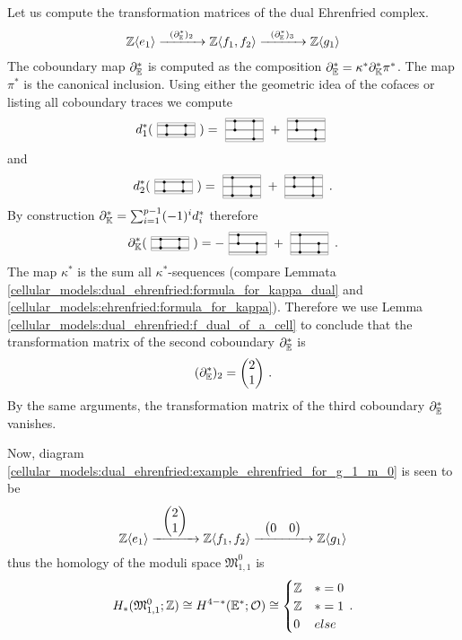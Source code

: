 Let us compute the transformation matrices of the dual Ehrenfried complex.
\begin{align}
    \label{cellular_models:dual_ehrenfried:example_ehrenfried_for_g_1_m_0}
    \Z\langle e_1 \rangle \xr{(\del^\ast_\E)_2} \Z\langle f_1, f_2 \rangle \xr{(\del^\ast_\E)_3} \Z\langle g_1 \rangle
\end{align}
The coboundary map $\partial_\mathbb E^\ast$ is computed as the composition $\partial_\mathbb E^\ast = \kappa^\ast \partial^\ast_\mathbb K \pi^\ast$.
The map $\pi^\ast$ is the canonical inclusion.
Using either the geometric idea of the cofaces or listing all coboundary traces we compute
\[
    d^\ast_1(\zweizweizelle{2}{1}{2}{1}) = \dreizweizelle{3}{2}{3}{1} + \dreizweizelle{3}{2}{2}{1}
\]
and
\[
    d^\ast_2(\zweizweizelle{2}{1}{2}{1}) = \dreizweizelle{3}{1}{2}{1} + \dreizweizelle{3}{2}{3}{1} \,.
\]
By construction $\partial^\ast_\mathbb K = \sum_{i=1}^{p-1} (-1)^i d^\ast_i$ therefore 
\[
    \del^\ast_\KK(\zweizweizelle{2}{1}{2}{1}) = - \dreizweizelle{3}{2}{2}{1} + \dreizweizelle{3}{1}{2}{1} \,.
\]
The map $\kappa^\ast$ is the sum all $\kappa^\ast$-sequences (compare Lemmata \ref{cellular_models:dual_ehrenfried:formula_for_kappa_dual} and \ref{cellular_models:ehrenfried:formula_for_kappa}).
Therefore we use Lemma \ref{cellular_models:dual_ehrenfried:f_dual_of_a_cell} to conclude that the transformation matrix of the second coboundary $\partial^\ast_\mathbb E$ is
\[
    (\partial^\ast_\mathbb E)_2 = \begin{pmatrix} 2 \\ 1 \end{pmatrix} \,.
\]
By the same arguments, the transformation matrix of the third coboundary $\partial^\ast_\mathbb E$ vanishes.

Now, diagram \eqref{cellular_models:dual_ehrenfried:example_ehrenfried_for_g_1_m_0} is seen to be
\[
    \mathbb Z\langle e_1 \rangle \xrightarrow{\hspace{6pt}{ \begin{pmatrix} 2 \\ 1 \end{pmatrix} }\hspace{6pt}} \mathbb Z\langle f_1, f_2 \rangle \xrightarrow{\hspace{6pt}{\begin{pmatrix} 0 & 0 \end{pmatrix}}\hspace{6pt}} \mathbb Z\langle g_1 \rangle
\]
thus the homology of the moduli space $\mathfrak M_{1,1}^0$ is
\[
    H_{\ast}( \mathfrak M_{1,1}^0; \mathbb Z ) \cong H^{4 - \ast}( \mathbb E^\ast; \mathcal O ) \cong
        \begin{cases}
            \mathbb Z & \ast = 0 \\
            \mathbb Z & \ast = 1 \\
            0  & else
        \end{cases} \,.
\]
